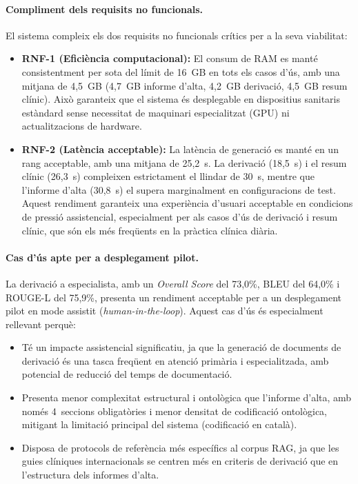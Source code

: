 \documentclass[CAT]{TFUOC}%
\begin{document}
\paragraph{Compliment dels requisits no funcionals.}
El sistema compleix els dos requisits no funcionals crítics per a la seva viabilitat:

\begin{itemize}
    \item \textbf{RNF-1 (Eficiència computacional):} El consum de RAM es manté consistentment per sota del límit de 16~GB en tots els casos d'ús, amb una mitjana de 4,5~GB (4,7~GB informe d'alta, 4,2~GB derivació, 4,5~GB resum clínic). Això garanteix que el sistema és desplegable en dispositius sanitaris estàndard sense necessitat de maquinari especialitzat (GPU) ni actualitzacions de hardware.
    
    \item \textbf{RNF-2 (Latència acceptable):} La latència de generació es manté en un rang acceptable, amb una mitjana de 25,2~s. La derivació (18,5~s) i el resum clínic (26,3~s) compleixen estrictament el llindar de 30~s, mentre que l'informe d'alta (30,8~s) el supera marginalment en configuracions de test. Aquest rendiment garanteix una experiència d'usuari acceptable en condicions de pressió assistencial, especialment per als casos d'ús de derivació i resum clínic, que són els més freqüents en la pràctica clínica diària.
\end{itemize}

\paragraph{Cas d'ús apte per a desplegament pilot.}
La derivació a especialista, amb un \textit{Overall Score} del 73,0\%, BLEU del 64,0\% i ROUGE-L del 75,9\%, presenta un rendiment acceptable per a un desplegament pilot en mode assistit (\textit{human-in-the-loop}). Aquest cas d'ús és especialment rellevant perquè:

\begin{itemize}
    \item Té un impacte assistencial significatiu, ja que la generació de documents de derivació és una tasca freqüent en atenció primària i especialitzada, amb potencial de reducció del temps de documentació.
    
    \item Presenta menor complexitat estructural i ontològica que l'informe d'alta, amb només 4~seccions obligatòries i menor densitat de codificació ontològica, mitigant la limitació principal del sistema (codificació en català).
    
    \item Disposa de protocols de referència més específics al corpus RAG, ja que les guies clíniques internacionals se centren més en criteris de derivació que en l'estructura dels informes d'alta.
\end{itemize}
\end{document}
